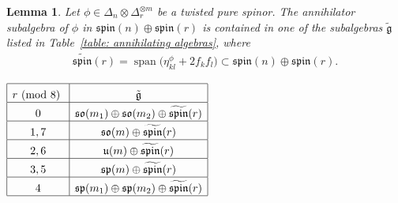 \documentclass[pdftex]{sigma}
\numberwithin{equation}{section}
\newtheorem{Lemma}[Theorem]{Lemma}
\begin{document}
\begin{Lemma}\label{lemma:stabilizer} Let $\phi\in\Delta_n\otimes\Delta_r^{\otimes m}$ be a twisted pure spinor. The annihilator subalgebra of $\phi$ in $\mathfrak{spin}(n)\oplus \mathfrak{spin}(r)$ is contained in one of the subalgebras $\tilde{\mathfrak{g}}$ listed in Table~{\rm \ref{table: annihilating algebras}},
where
\begin{gather*}\widetilde{\mathfrak{spin}}(r)=\operatorname{span}\big(\eta_{kl}^\phi+2f_kf_l\big)\subset \mathfrak{spin}(n)\oplus \mathfrak{spin}(r).\end{gather*}
\end{Lemma}

\begin{table}[h!]\centering
$
\begin{array}{|c|c|}
 \hline
 r \mbox{\ {\rm (mod 8)} } & \tilde{\mathfrak{g}}
 \rule{0pt}{3ex}
 \\
 \hline
 0 & \mathfrak{so}(m_1)\oplus\mathfrak{so}(m_2)\oplus \widetilde{\mathfrak{spin}}(r)\rule{0pt}{3ex}\\
 \hline
 1,7 & \mathfrak{so}(m)\oplus \widetilde{\mathfrak{spin}}(r)\rule{0pt}{3ex}\\
\hline
 2,6 & \mathfrak{u}(m)\oplus \widetilde{\mathfrak{spin}}(r)\rule{0pt}{3ex}\\
\hline
 3,5 & \mathfrak{sp}(m)\oplus \widetilde{\mathfrak{spin}}(r)\rule{0pt}{3ex}\\
\hline
 4 & \mathfrak{sp}(m_1)\oplus \mathfrak{sp}(m_2)\oplus \widetilde{\mathfrak{spin}}(r)\rule{0pt}{3ex}\\
\hline
 \end{array}
$
\caption{}\label{table: annihilating algebras}
\end{table}
\end{document}
